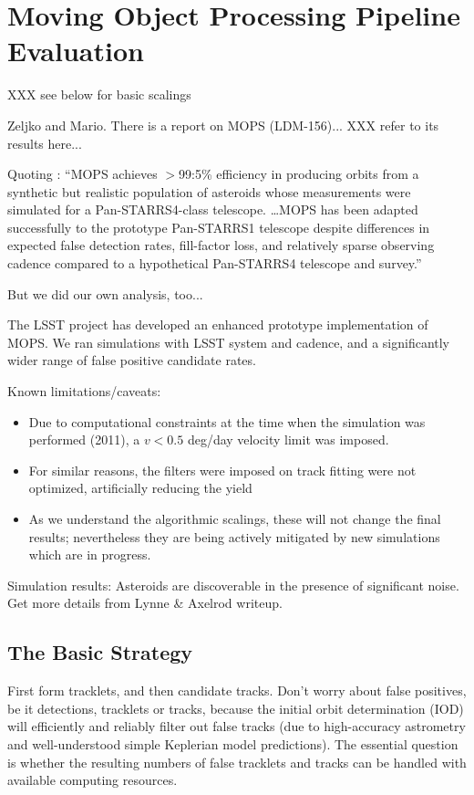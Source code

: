 
\section{Moving Object Processing Pipeline Evaluation}

XXX see below for basic scalings 

Zeljko and Mario. There is a report on MOPS (LDM-156)...   XXX refer to its
results here... 

Quoting \cite{denneau13}: ``MOPS achieves $>$99:5\% efficiency in
producing orbits from a synthetic
but realistic population of asteroids whose measurements were
simulated for a Pan-STARRS4-class telescope. \dots MOPS has been
adapted successfully to the prototype Pan-STARRS1 telescope despite
differences in expected false detection rates, fill-factor loss, and
relatively sparse observing cadence compared to a hypothetical
Pan-STARRS4 telescope and survey.'' 

But we did our own analysis, too...

The LSST project has developed an enhanced prototype implementation of MOPS.
We ran simulations with LSST system and cadence, and a significantly
wider range of false positive candidate rates. 

Known limitations/caveats:
\begin{itemize}
\item Due to computational constraints at the time when the simulation
  was performed (2011), a $v < 0.5$ deg/day velocity limit was
  imposed.
\item For similar reasons, the filters were imposed on track fitting
  were not optimized, artificially reducing the yield
\item As we understand the algorithmic scalings, these will not change the
final results; nevertheless they are being actively mitigated by new
simulations which are in progress.
\end{itemize}

Simulation results: Asteroids are discoverable in the presence of significant noise.
Get more details from Lynne \& Axelrod writeup. 

\newpage

\subsection{The Basic Strategy} 

First form tracklets, and then candidate tracks. Don't worry about false positives, 
be it detections, tracklets or tracks, because the initial orbit determination (IOD) 
will efficiently and reliably filter out false tracks (due to high-accuracy astrometry 
and well-understood simple Keplerian model predictions). The essential question
is whether the resulting numbers of false tracklets and tracks can be handled with 
available computing resources.

